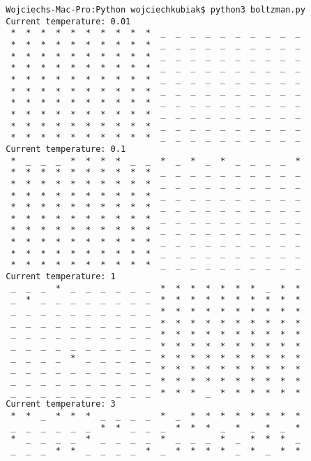 \documentclass[11pt]{article}
\begin{document}
    \begin{lstlisting}
        Wojciechs-Mac-Pro:Python wojciechkubiak$ python3 boltzman.py 
        Current temperature: 0.01
         *  *  *  *  *  *  *  *  *  *  _  _  _  _  _  _  _  _  _  _  
         *  *  *  *  *  *  *  *  *  *  _  _  _  _  _  _  _  _  _  _  
         *  *  *  *  *  *  *  *  *  *  _  _  _  _  _  _  _  _  _  _  
         *  *  *  *  *  *  *  *  *  *  _  _  _  _  _  _  _  _  _  _  
         *  *  *  *  *  *  *  *  *  *  _  _  _  _  _  _  _  _  _  _  
         *  *  *  *  *  *  *  *  *  *  _  _  _  _  _  _  _  _  _  _  
         *  *  *  *  *  *  *  *  *  *  _  _  _  _  _  _  _  _  _  _  
         *  *  *  *  *  *  *  *  *  *  _  _  _  _  _  _  _  _  _  _  
         *  *  *  *  *  *  *  *  *  *  _  _  _  _  _  _  _  _  _  _  
         *  *  *  *  *  *  *  *  *  *  _  _  _  _  _  _  _  _  _  _  
        Current temperature: 0.1
         *  _  _  _  *  *  *  *  _  _  *  _  *  _  *  _  _  _  _  *  
         *  *  *  *  *  *  *  *  *  *  _  _  _  _  _  _  _  _  _  _  
         *  *  *  *  *  *  *  *  *  *  _  _  _  _  _  _  _  _  _  _  
         *  *  *  *  *  *  *  *  *  *  _  _  _  _  _  _  _  _  _  _  
         *  *  *  *  *  *  *  *  *  *  _  _  _  _  _  _  _  _  _  _  
         *  *  *  *  *  *  *  *  *  *  _  _  _  _  _  _  _  _  _  _  
         *  *  *  *  *  *  *  *  *  *  _  _  _  _  _  _  _  _  _  _  
         *  *  *  *  *  *  *  *  *  *  _  _  _  _  _  _  _  _  _  _  
         *  *  *  *  *  *  *  *  *  *  _  _  _  _  _  _  _  _  _  _  
         *  *  *  *  *  *  *  *  *  *  _  _  _  _  _  _  _  _  _  _  
        Current temperature: 1
         _  _  _  *  _  _  _  _  _  _  *  *  *  *  *  *  *  _  *  *  
         _  *  _  _  _  _  _  _  _  _  *  *  *  *  *  *  *  *  *  *  
         _  _  _  _  _  _  _  _  _  _  *  *  *  *  *  *  *  *  *  *  
         _  _  _  _  _  _  _  _  _  _  *  *  *  *  *  *  *  *  *  *  
         _  _  _  _  _  _  _  _  _  _  *  *  *  *  *  *  *  *  *  *  
         _  _  _  _  _  _  _  _  _  _  *  *  *  *  *  *  *  *  *  *  
         _  _  _  _  *  _  _  _  _  _  *  *  *  *  *  *  *  *  *  *  
         _  _  _  _  _  _  _  _  _  _  *  *  *  *  *  *  *  *  *  *  
         _  _  _  _  _  _  _  _  _  _  *  *  *  *  *  *  *  *  *  *  
         _  _  _  _  _  _  _  _  _  _  *  *  *  _  *  *  *  *  *  *  
        Current temperature: 3
         *  *  _  *  *  *  _  _  _  _  *  _  *  *  *  *  *  *  *  *  
         _  _  _  _  _  _  *  *  _  _  _  *  *  *  _  *  _  *  _  *  
         *  _  _  _  _  *  _  _  _  _  *  _  _  _  *  _  *  *  *  _  
         _  _  _  *  *  _  _  _  _  *  _  *  *  *  *  _  *  _  *  *  

\end{lstlisting}
\end{document}
